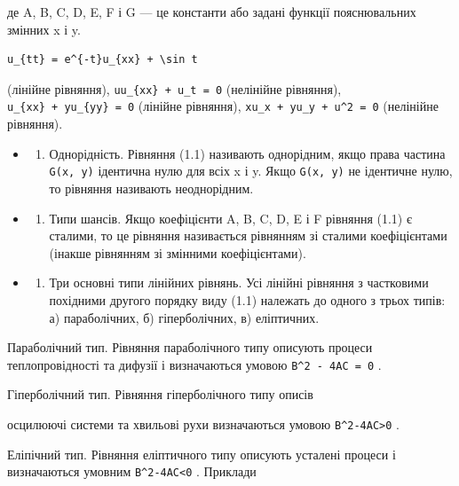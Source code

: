 \documentclass[
  ukrainian,
]{article}
\providecommand{\tightlist}{%
  \setlength{\itemsep}{0pt}\setlength{\parskip}{0pt}}
\begin{document}
де A, B, C, D, E, F і G --- це константи або задані функції
пояснювальних змінних x і y.

\begin{verbatim}
u_{tt} = e^{-t}u_{xx} + \sin t
\end{verbatim}

(лінійне рівняння), \texttt{uu\_\{xx\}\ +\ u\_t\ =\ 0} (нелінійне
рівняння), \texttt{u\_\{xx\}\ +\ yu\_\{yy\}\ =\ 0} (лінійне рівняння),
\texttt{xu\_x\ +\ yu\_y\ +\ u\^{}2\ =\ 0} (нелінійне рівняння).

\begin{itemize}
\tightlist
\item
  \begin{enumerate}
  \def\labelenumi{\arabic{enumi}.}
  \setcounter{enumi}{3}
  \tightlist
  \item
    Однорідність. Рівняння (1.1) називають однорідним, якщо права
    частина \texttt{G(x,\ y)} ідентична нулю для всіх x і y. Якщо
    \texttt{G(x,\ y)} не ідентичне нулю, то рівняння називають
    неоднорідним.
  \end{enumerate}
\item
  \begin{enumerate}
  \def\labelenumi{\arabic{enumi}.}
  \setcounter{enumi}{4}
  \tightlist
  \item
    Типи шансів. Якщо коефіцієнти A, B, C, D, E і F рівняння (1.1) є
    сталими, то це рівняння називається рівнянням зі сталими
    коефіцієнтами (інакше рівнянням зі змінними коефіцієнтами).
  \end{enumerate}
\item
  \begin{enumerate}
  \def\labelenumi{\arabic{enumi}.}
  \setcounter{enumi}{5}
  \tightlist
  \item
    Три основні типи лінійних рівнянь. Усі лінійні рівняння з частковими
    похідними другого порядку виду (1.1) належать до одного з трьох
    типів: а) параболічних, б) гіперболічних, в) еліптичних.
  \end{enumerate}
\end{itemize}

Параболічний тип. Рівняння параболічного типу описують процеси
теплопровідності та дифузії і визначаються умовою
\texttt{B\^{}2\ -\ 4AC\ =\ 0} .

Гіперболічний тип. Рівняння гіперболічного типу описів

осцилюючі системи та хвильові рухи визначаються умовою
\texttt{B\^{}2-4AC\textgreater{}0} .

Еліпічний тип. Рівняння еліптичного типу описують усталені процеси і
визначаються умовним \texttt{B\^{}2-4AC\textless{}0} . Приклади
\end{document}
